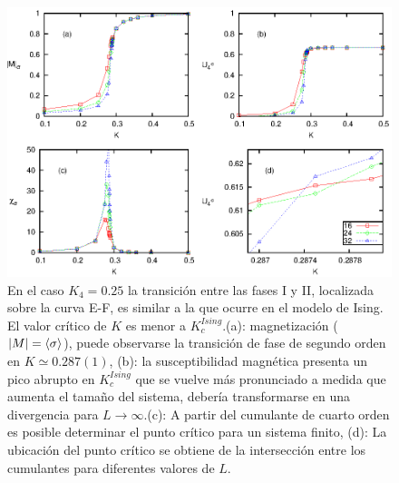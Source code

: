 \begin{figure}[h!]
	\begin{center}
		\includegraphics[scale=0.8]{graf/phases/multi_AT_I_II_c.eps}
	\end{center}
	\caption{En el caso $K_{4}=0.25$ la transición entre las fases I y II, localizada sobre la curva E-F, es similar a la que ocurre en el modelo de Ising.
	El valor crítico de $K$ es menor a $K_{c}^{Ising}$.(a): magnetización ($|M|=\langle \sigma \rangle$), puede observarse la transici\'on de fase de segundo orden en $K\simeq 0.287(1)$,
	(b): la susceptibilidad magn\'etica presenta un pico abrupto en $K_{c}^{Ising}$ que se vuelve m\'as pronunciado a medida que
	aumenta el tamaño del sistema, deber\'ia transformarse en una divergencia para $L\rightarrow \infty$.(c): A partir
	del cumulante de cuarto orden es posible determinar el punto cr\'itico para un sistema finito, (d): La ubicaci\'on del
	punto cr\'itico se obtiene de la intersecci\'on entre los cumulantes para diferentes valores de $L$.}
	\label{fig:multi_AT_I_II_c}
\end{figure}


